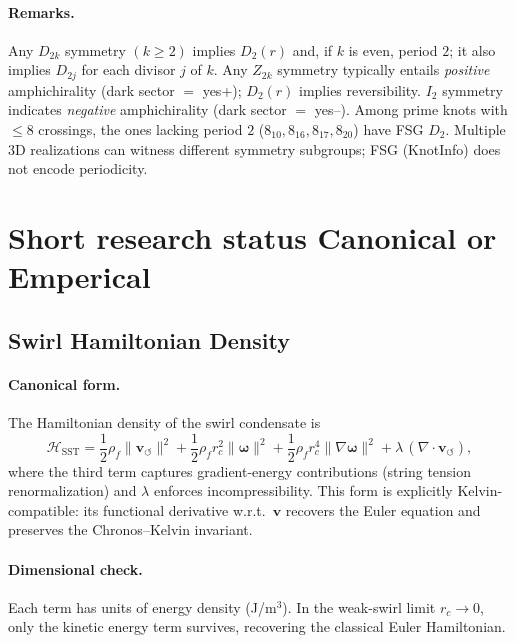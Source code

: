 \documentclass[10pt,reprint,aps,onecolumn,nofootinbib]{revtex4-2}
\begin{document}
        \paragraph{Remarks.}
            Any $D_{2k}$ symmetry $(k\ge 2)$ implies $D_2(r)$ and, if $k$ is even, period $2$; it also implies $D_{2j}$ for each divisor $j$ of $k$. Any $Z_{2k}$ symmetry typically entails \emph{positive} amphichirality (dark sector $=$ yes+); $D_2(r)$ implies reversibility. $I_2$ symmetry indicates \emph{negative} amphichirality (dark sector $=$ yes--). Among prime knots with $\le 8$ crossings, the ones lacking period $2$ ($8_{10}, 8_{16}, 8_{17}, 8_{20}$) have FSG $D_2$. Multiple 3D realizations can witness different symmetry subgroups; FSG (KnotInfo) does not encode periodicity.

\section{Short research status Canonical or Emperical}
    \subsection{Swirl Hamiltonian Density}
        \label{canon58:appA}
        \paragraph{Canonical form.}
            The Hamiltonian density of the swirl condensate is
            \[
                \mathcal{H}_{\mathrm{SST}} =
                \frac{1}{2} \rho_{\!f} \lVert \mathbf{v}_{\!\boldsymbol{\circlearrowleft}}\rVert^2
                + \frac{1}{2} \rho_{\!f} r_c^{2} \lVert \boldsymbol{\omega} \rVert^{2}
                + \frac{1}{2} \rho_{\!f} r_c^{4} \lVert \nabla \boldsymbol{\omega} \rVert^{2}
                + \lambda\,(\nabla \cdot \mathbf{v}_{\!\boldsymbol{\circlearrowleft}}),
            \]
            where the third term captures gradient-energy contributions (string tension renormalization)
            and $\lambda$ enforces incompressibility. This form is explicitly Kelvin-compatible:
            its functional derivative w.r.t.\ $\mathbf{v}$ recovers the Euler equation and preserves
            the Chronos–Kelvin invariant.

        \paragraph{Dimensional check.}
            Each term has units of energy density (J/m$^3$). In the weak-swirl limit $r_c \to 0$,
            only the kinetic energy term survives, recovering the classical Euler Hamiltonian.
\end{document}
